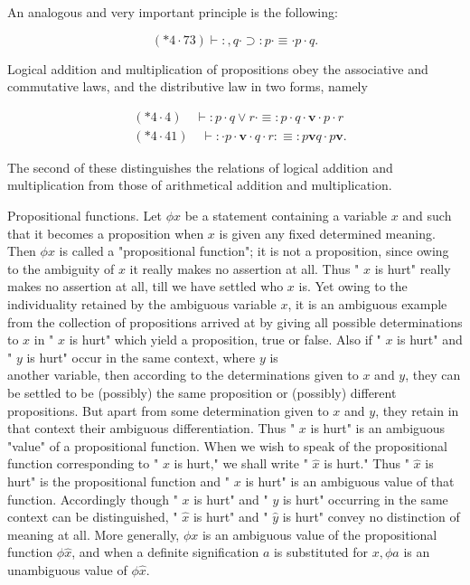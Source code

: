 \documentclass[10pt]{article}
\begin{document}
An analogous and very important principle is the following:

$$
(* 4 \cdot 73) \vdash:, q \cdot \supset: p \cdot \equiv \cdot p \cdot q .
$$

Logical addition and multiplication of propositions obey the associative and commutative laws, and the distributive law in two forms, namely

$$
\begin{aligned}
& (* 4 \cdot 4) \quad \vdash: p \cdot q \vee r \cdot \equiv: p \cdot q \cdot \mathbf{v} \cdot p \cdot r \\
& (* 4 \cdot 41) \quad \vdash: \cdot p \cdot \mathbf{v} \cdot q \cdot r: \equiv: p \mathbf{v} q \cdot p \mathbf{v} .
\end{aligned}
$$

The second of these distinguishes the relations of logical addition and multiplication from those of arithmetical addition and multiplication.

Propositional functions. Let $\phi x$ be a statement containing a variable $x$ and such that it becomes a proposition when $x$ is given any fixed determined meaning. Then $\phi x$ is called a "propositional function"; it is not a proposition, since owing to the ambiguity of $x$ it really makes no assertion at all. Thus " $x$ is hurt" really makes no assertion at all, till we have settled who $x$ is. Yet owing to the individuality retained by the ambiguous variable $x$, it is an ambiguous example from the collection of propositions arrived at by giving all possible determinations to $x$ in " $x$ is hurt" which yield a proposition, true or false. Also if " $x$ is hurt" and " $y$ is hurt" occur in the same context, where $y$ is\\
another variable, then according to the determinations given to $x$ and $y$, they can be settled to be (possibly) the same proposition or (possibly) different propositions. But apart from some determination given to $x$ and $y$, they retain in that context their ambiguous differentiation. Thus " $x$ is hurt" is an ambiguous "value" of a propositional function. When we wish to speak of the propositional function corresponding to " $x$ is hurt," we shall write " $\widehat{x}$ is hurt." Thus " $\hat{x}$ is hurt" is the propositional function and " $x$ is hurt" is an ambiguous value of that function. Accordingly though " $x$ is hurt" and " $y$ is hurt" occurring in the same context can be distinguished, " $\hat{x}$ is hurt" and " $\hat{y}$ is hurt" convey no distinction of meaning at all. More generally, $\phi x$ is an ambiguous value of the propositional function $\phi \hat{x}$, and when a definite signification $a$ is substituted for $x, \phi a$ is an unambiguous value of $\phi \hat{x}$.
\end{document}
